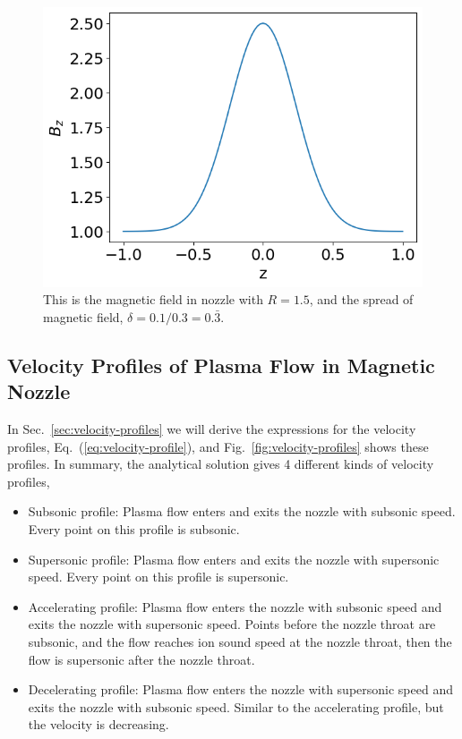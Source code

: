 \begin{figure}[htbp]
	\centering
	\includegraphics[width=0.7\linewidth]{figures/magnetic-field}
	\caption{This is the magnetic field in nozzle with $R=1.5$, and the spread of magnetic field, $\delta=0.1/0.3=0.\bar{3}$. }
	\label{fig:magnetic-field}
\end{figure}

\subsection{Velocity Profiles of Plasma Flow in Magnetic Nozzle}
In Sec.~\ref{sec:velocity-profiles} we will derive the expressions for the velocity profiles, Eq.~(\ref{eq:velocity-profile}), and Fig.~\ref{fig:velocity-profiles} shows these profiles. In summary, the analytical solution gives 4 different kinds of velocity profiles,
\begin{itemize}
	\item Subsonic profile: Plasma flow enters and exits the nozzle with subsonic speed. Every point on this profile is subsonic.
	\item Supersonic profile: Plasma flow enters and exits the nozzle with supersonic speed. Every point on this profile is supersonic.
	\item Accelerating profile: Plasma flow enters the nozzle with subsonic speed and exits the nozzle with supersonic speed. Points before the nozzle throat are subsonic, and the flow reaches ion sound speed at the nozzle throat, then the flow is supersonic after the nozzle throat.
	\item Decelerating profile: Plasma flow enters the nozzle with supersonic speed and exits the nozzle with subsonic speed. Similar to the accelerating profile, but the velocity is decreasing.
\end{itemize}


